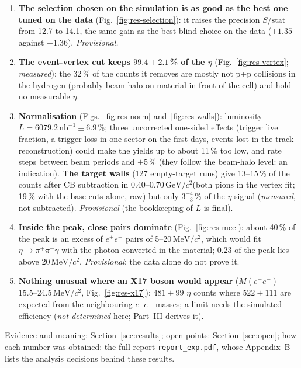 \documentclass[11pt,a4paper]{article}
\newcommand{\ee}{\ensuremath{e^{+}e^{-}}\xspace}
\newcommand{\Mee}{\ensuremath{M(e^{+}e^{-})}\xspace}
\newcommand{\GeVcc}{\ensuremath{\mathrm{GeV}/c^{2}}\xspace}
\newcommand{\MeVcc}{\ensuremath{\mathrm{MeV}/c^{2}}\xspace}
\begin{document}
{{\begin{enumerate}
      (Figs.~\ref{fig:res-cb} and~\ref{fig:res-cbnull}): 7--10\,\% of the counts in the peak window (5.5\,\% for the data-tuned selection,
      1.9\,\% in the X17 search band); $\pm3$\,\% moves $S$ by $<0.1$\,\%, a 38--45\,\% larger CB by $\le1$\,\% (up to 2.3\,\% with
      only the best-ranked combination of each event and in the X17 search band). \emph{Final}; its absolute scale is \emph{not
      determined} (not checkable with data alone).
\item \textbf{The selection chosen on the simulation is as good as the best one tuned on the data} (Fig.~\ref{fig:res-selection}): it raises
      the precision $S/\mathrm{stat}$ from 12.7 to 14.1, the same gain as the best blind choice on the data ($+1.35$ against $+1.36$).
      \emph{Provisional.}
\item \textbf{The event-vertex cut keeps $99.4\pm2.1$\,\% of the $\eta$} (Fig.~\ref{fig:res-vertex}; \emph{measured}); the 32\,\% of the
      counts it removes are mostly not p+p collisions in the hydrogen (probably beam halo on material in front of the cell) and hold no
      measurable $\eta$.
\item \textbf{Normalisation} (Figs.~\ref{fig:res-norm} and~\ref{fig:res-walls}): luminosity $L=6079.2\,\mathrm{nb}^{-1}\pm6.9$\,\%; three
      uncorrected one-sided effects (trigger live fraction, a trigger loss in one sector on the first days, events lost in the track
      reconstruction) could make the yields up to about 11\,\% too low, and rate steps between beam periods add $\pm5$\,\% (they follow
      the beam-halo level: an indication). \textbf{The target walls} (127 empty-target runs) give 13--15\,\% of the counts after CB
      subtraction in 0.40--0.70\,\GeVcc (both pions in the vertex fit; 19\,\% with the base cuts alone, raw) but only $3^{+4}_{-3}$\,\% of
      the $\eta$ signal (\emph{measured}, not subtracted). \emph{Provisional} (the bookkeeping of $L$ is final).
\item \textbf{Inside the peak, close pairs dominate} (Fig.~\ref{fig:res-mee}): about 40\,\% of the peak is an excess of \ee pairs of
      5--20\,\MeVcc, which would fit $\eta\to\pi^+\pi^-\gamma$ with the photon converted in the material; 0.23 of the peak lies above
      20\,\MeVcc. \emph{Provisional}: the data alone do not prove it.
\item \textbf{Nothing unusual where an X17 boson would appear} (\Mee 15.5--24.5\,\MeVcc, Fig.~\ref{fig:res-x17}): $481\pm99$ $\eta$ counts
      where $522\pm111$ are expected from the neighbouring \ee masses; a limit needs the simulated efficiency (\emph{not determined}
      here; Part~III derives it).
\end{enumerate}
Evidence and meaning: Section~\ref{sec:results}; open points: Section~\ref{sec:open}; how each number was obtained: the full report
\texttt{report\_exp.pdf}, whose Appendix~B lists the analysis decisions behind these results.}}
\end{document}
